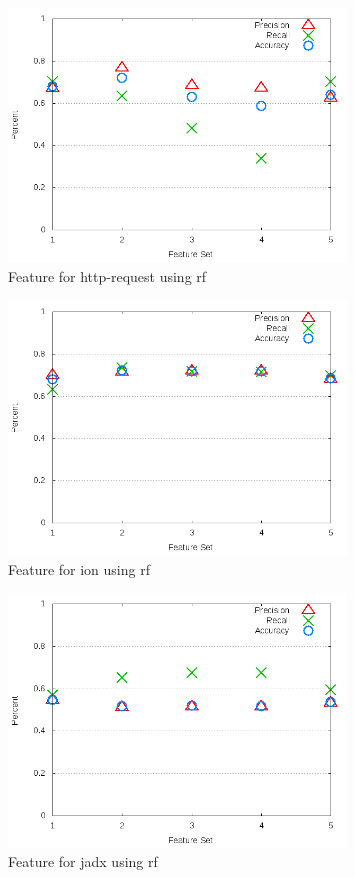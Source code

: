 \begin{figure}[!t]
\centering
\includegraphics[width=0.8\textwidth]{images/rf/test_3/http-request_sample_range.png}
\caption{Feature for http-request using \gls{rf}}
\label{fig:test_3_http-request_rf}
\end{figure}

\clearpage
\begin{figure}[!t]
\centering
\includegraphics[width=0.8\textwidth]{images/rf/test_3/ion_sample_range.png}
\caption{Feature for ion using \gls{rf}}
\label{fig:test_3_ion_rf}
\end{figure}

\begin{figure}[!t]
\centering
\includegraphics[width=0.8\textwidth]{images/rf/test_3/jadx_sample_range.png}
\caption{Feature for jadx using \gls{rf}}
\label{fig:test_3_jadx_rf}
\end{figure}

